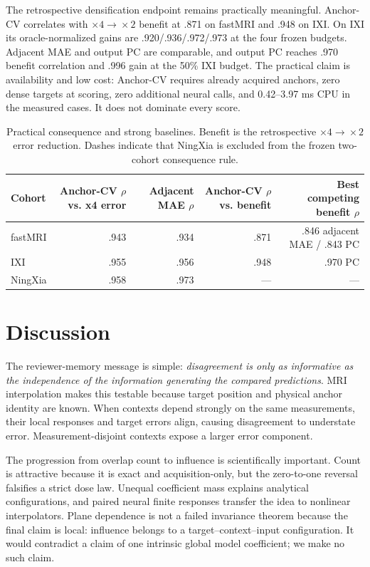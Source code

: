 \documentclass[10pt,twocolumn,letterpaper]{article}
\begin{document}
The retrospective densification endpoint remains practically meaningful. Anchor-CV correlates with $\times4\!\rightarrow\!\times2$ benefit at .871 on fastMRI and .948 on IXI. On IXI its oracle-normalized gains are .920/.936/.972/.973 at the four frozen budgets. Adjacent MAE and output PC are comparable, and output PC reaches .970 benefit correlation and .996 gain at the 50\% IXI budget. The practical claim is availability and low cost: Anchor-CV requires already acquired anchors, zero dense targets at scoring, zero additional neural calls, and 0.42--3.97 ms CPU in the measured cases. It does not dominate every score.

\begin{table}[t]
\centering
\caption{Practical consequence and strong baselines. Benefit is the retrospective $\times4\!\rightarrow\!\times2$ error reduction. Dashes indicate that NingXia is excluded from the frozen two-cohort consequence rule.}
\label{tab:practical}
\setlength{\tabcolsep}{4pt}
\begin{tabular}{lrrrr}
\toprule
Cohort & Anchor-CV $\rho$ vs. x4 error & Adjacent MAE $\rho$ & Anchor-CV $\rho$ vs. benefit & Best competing benefit $\rho$ \\
\midrule
fastMRI & .943 & .934 & .871 & .846 adjacent MAE / .843 PC \\
IXI & .955 & .956 & .948 & .970 PC \\
NingXia & .958 & .973 & --- & --- \\
\bottomrule
\end{tabular}
\end{table}

\FloatBarrier

\raggedbottom
\section{Discussion}
The reviewer-memory message is simple: \emph{disagreement is only as informative as the independence of the information generating the compared predictions}. MRI interpolation makes this testable because target position and physical anchor identity are known. When contexts depend strongly on the same measurements, their local responses and target errors align, causing disagreement to understate error. Measurement-disjoint contexts expose a larger error component.

The progression from overlap count to influence is scientifically important. Count is attractive because it is exact and acquisition-only, but the zero-to-one reversal falsifies a strict dose law. Unequal coefficient mass explains analytical configurations, and paired neural finite responses transfer the idea to nonlinear interpolators. Plane dependence is not a failed invariance theorem because the final claim is local: influence belongs to a target--context--input configuration. It would contradict a claim of one intrinsic global model coefficient; we make no such claim.
\end{document}
